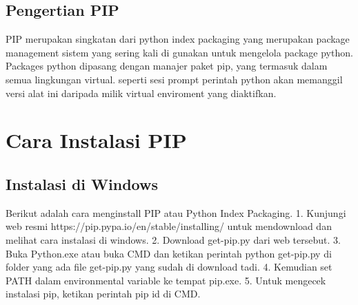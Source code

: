 \documentclass[12pt,a4paper]{article}
\begin{document}
\subsection{Pengertian PIP}
PIP merupakan singkatan dari python index packaging yang merupakan package management sistem yang sering kali di gunakan untuk mengelola package python. Packages python dipasang dengan manajer paket pip, yang termasuk dalam semua lingkungan virtual. seperti sesi prompt perintah python akan memanggil versi alat ini daripada milik virtual enviroment yang diaktifkan.

\section{Cara Instalasi PIP}
\subsection{Instalasi di Windows}
Berikut adalah cara menginstall PIP atau Python Index Packaging.
1.	Kunjungi web resmi https://pip.pypa.io/en/stable/installing/ untuk mendownload dan melihat cara instalasi di windows.
2.	Download get-pip.py dari web tersebut.
3.	Buka Python.exe atau buka CMD dan ketikan perintah python get-pip.py di folder yang ada file get-pip.py yang sudah di 	download tadi.
4.	Kemudian set PATH dalam environmental variable ke tempat pip.exe.
5.	Untuk mengecek instalasi pip, ketikan perintah pip id di CMD.
\end{document}
